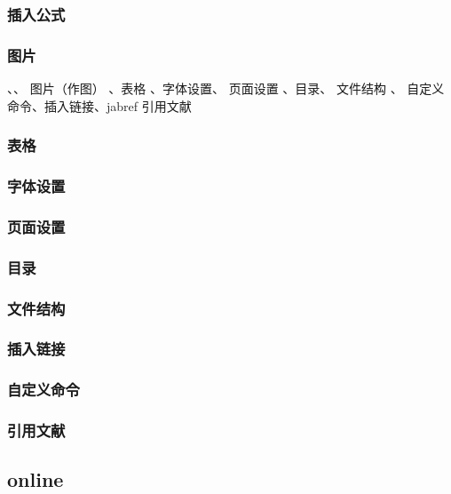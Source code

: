 \documentclass[11pt]{ctexart}
\begin{document}
\subsubsection{插入公式}

\subsubsection{图片}
 、、  图片（作图） 、表格  、字体设置、 页面设置 、目录、 文件结构 、 自定义命令、插入链接、jabref 引用文献 
 
 \subsubsection{表格}
 
 \subsubsection{字体设置}
 
 \subsubsection{页面设置}
 
 \subsubsection{目录}
 
 \subsubsection{文件结构}
 
 \subsubsection{插入链接}
 
 \subsubsection{自定义命令}
 
 \subsubsection{引用文献}
 
 \subsection{online}
 
\end{document}
